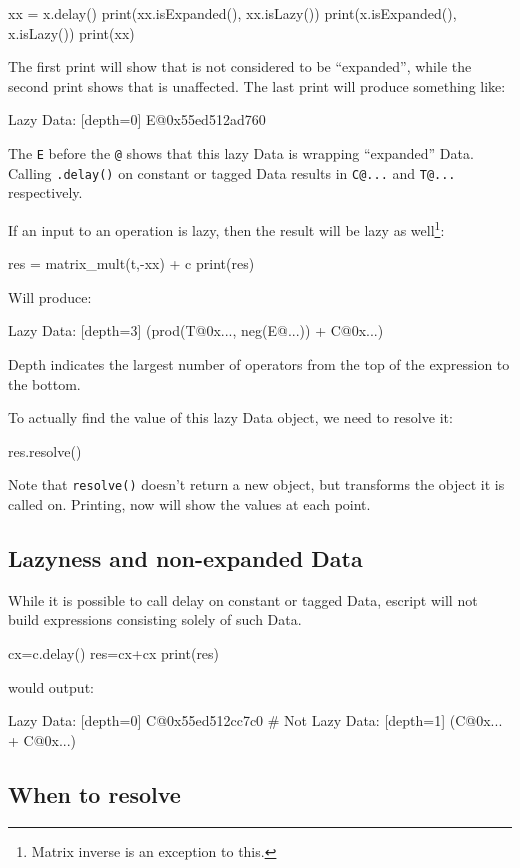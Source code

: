 \begin{python}
xx = x.delay()
print(xx.isExpanded(), xx.isLazy())
print(x.isExpanded(), x.isLazy())
print(xx)
\end{python}

The first print will show that  is not considered to be ``expanded'', while the second print shows that  is unaffected.
The last print will produce something like:
\begin{python}
Lazy Data: [depth=0] E@0x55ed512ad760
\end{python}
The \texttt{E} before the \verb|@| shows that this lazy Data is wrapping ``expanded'' Data.
Calling \texttt{.delay()} on constant or tagged Data results in \verb|C@...| and \verb|T@...| respectively.

If an input to an operation is lazy, then the result will be lazy as well\footnote{Matrix inverse is an exception to this.}:
\begin{python}
res = matrix_mult(t,-xx) + c
print(res)
\end{python}
Will produce:
\begin{python}
Lazy Data: [depth=3] (prod(T@0x..., neg(E@...)) + C@0x...)
\end{python}
Depth indicates the largest number of operators from the top of the expression to the bottom.

To actually find the value of this lazy Data object, we need to resolve it:
\begin{python}
res.resolve()
\end{python}
Note that \texttt{resolve()} doesn't return a new object, but transforms the object it is called on.
Printing,  now will show the values at each point.

\subsection{Lazyness and non-expanded Data}
While it is possible to call delay on constant or tagged Data, escript will not build expressions consisting solely of such Data.
\begin{python}
cx=c.delay()
res=cx+cx
print(res)
\end{python}
would output:
\begin{python}
Lazy Data: [depth=0] C@0x55ed512cc7c0
# Not
Lazy Data: [depth=1] (C@0x... + C@0x...)
\end{python}


\subsection{When to resolve}

